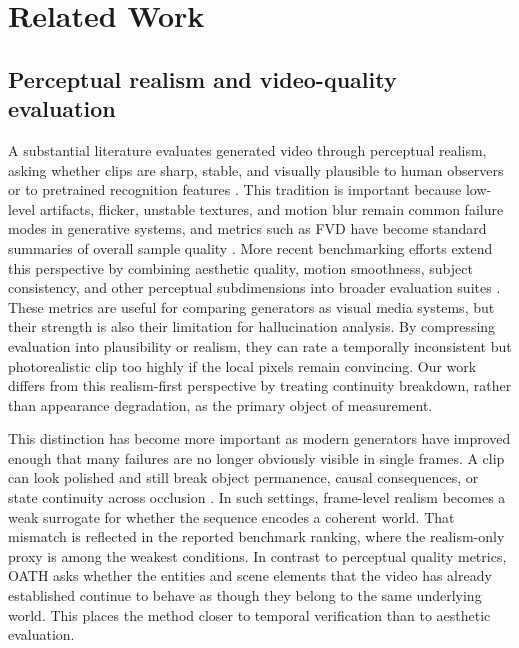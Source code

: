 \documentclass{article}
\begin{document}
\section{Related Work}

\subsection{Perceptual realism and video-quality evaluation}

A substantial literature evaluates generated video through perceptual realism, asking whether clips are sharp, stable, and visually plausible to human observers or to pretrained recognition features \cite{fvd2018,vbench2024,videoscore2024,fideseq2024,imagenvideo2022,makeavideo2022}. This tradition is important because low-level artifacts, flicker, unstable textures, and motion blur remain common failure modes in generative systems, and metrics such as FVD have become standard summaries of overall sample quality \cite{fvd2018,imagenvideo2022,makeavideo2022}. More recent benchmarking efforts extend this perspective by combining aesthetic quality, motion smoothness, subject consistency, and other perceptual subdimensions into broader evaluation suites \cite{vbench2024,t2vcompbench2024}. These metrics are useful for comparing generators as visual media systems, but their strength is also their limitation for hallucination analysis. By compressing evaluation into plausibility or realism, they can rate a temporally inconsistent but photorealistic clip too highly if the local pixels remain convincing. Our work differs from this realism-first perspective by treating continuity breakdown, rather than appearance degradation, as the primary object of measurement.

This distinction has become more important as modern generators have improved enough that many failures are no longer obviously visible in single frames. A clip can look polished and still break object permanence, causal consequences, or state continuity across occlusion \cite{sora2024,videogpt2021,worldsim2024}. In such settings, frame-level realism becomes a weak surrogate for whether the sequence encodes a coherent world. That mismatch is reflected in the reported benchmark ranking, where the realism-only proxy is among the weakest conditions. In contrast to perceptual quality metrics, OATH asks whether the entities and scene elements that the video has already established continue to behave as though they belong to the same underlying world. This places the method closer to temporal verification than to aesthetic evaluation.
\end{document}
